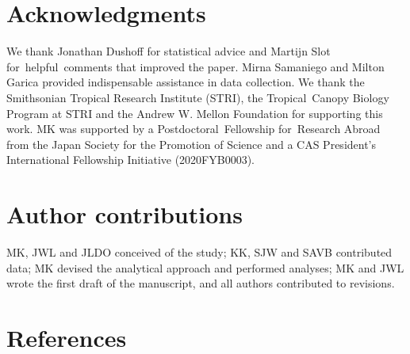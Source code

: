 \documentclass[
  12pt,
  letterpaper,
  DIV=11,
  numbers=noendperiod]{scrartcl}
\begin{document}
\hypertarget{acknowledgments}{%
\section{Acknowledgments}\label{acknowledgments}}

We thank Jonathan Dushoff for statistical advice and Martijn Slot
for~helpful~comments that improved the paper. Mirna Samaniego and Milton
Garica provided indispensable assistance in data collection. We thank
the Smithsonian Tropical Research Institute (STRI), the Tropical~Canopy
Biology Program at STRI and the Andrew W. Mellon Foundation for
supporting this work. MK was supported by a Postdoctoral~Fellowship
for~Research Abroad from the Japan Society for the Promotion of Science
and a CAS President's International Fellowship Initiative (2020FYB0003).

\hypertarget{author-contributions}{%
\section{Author contributions}\label{author-contributions}}

MK, JWL and JLDO conceived of the study; KK, SJW and SAVB contributed
data; MK devised the analytical approach and performed analyses; MK and
JWL wrote the first draft of the manuscript, and all authors contributed
to revisions.

\hypertarget{references}{%
\section{References}\label{references}}
\end{document}
